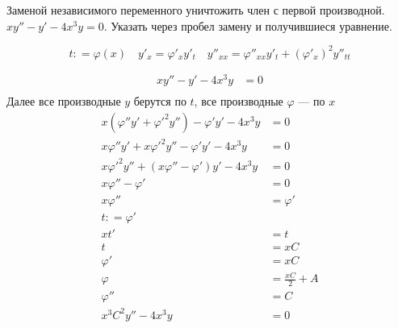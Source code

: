 \section{}

Заменой независимого переменного уничтожить член с первой производной. \(xy''-y'-4x^3y=0\). Указать через пробел замену и получившиеся уравнение.

\[
    t : = \varphi(x) \quad y'_x = \varphi'_x y'_t \quad y''_{xx} = \varphi''_{xx} y'_t + (\varphi'_x)^2 y''_{tt}
\]

\begin{align*}
    xy''-y'-4x^3y & = 0 \\
\end{align*}
Далее все производные \(y\) берутся по \(t\), все производные \(\varphi\) --- по \(x\)
\begin{align*}
    x(\varphi'' y' + \varphi'^2 y'')-\varphi' y' - 4x^3y & = 0                \\
    x\varphi'' y' + x\varphi'^2 y''-\varphi' y' - 4x^3y  & = 0                \\
    x\varphi'^2 y'' + (x\varphi'' - \varphi') y' - 4x^3y & = 0                \\
    x\varphi'' - \varphi'                                & = 0                \\
    x\varphi''                                           & = \varphi'         \\
    t : = \varphi'                                                            \\
    xt'                                                  & = t                \\
    t                                                    & = xC               \\
    \varphi'                                             & = xC               \\
    \varphi                                              & = \frac{xC}{2} + A \\
    \varphi''                                            & = C                \\
    x^3C^2 y'' - 4x^3y                                   & = 0                \\
\end{align*}

\section{}

